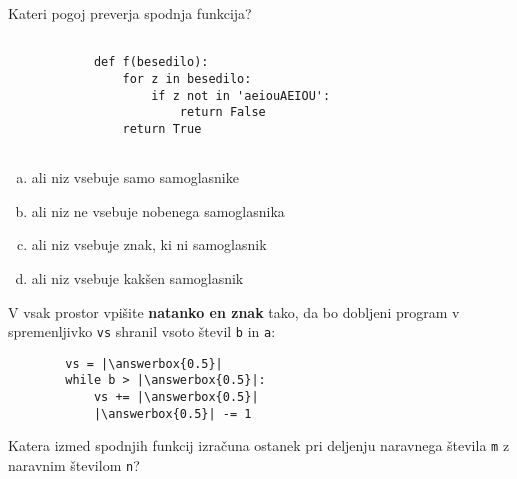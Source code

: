 \documentclass[arhiv, 10pt]{../izpit}
\newcommand{\inlinepy}[1]{\texttt{#1}}
\newcommand{\answerbox}[1]{\framebox{\vphantom{\large M}\hspace{#1cm}}}
\begin{document}
        \naloga*

        \begin{multicols}{2}
        \noindent
        Kateri pogoj preverja spodnja funkcija?
        \begin{verbatim}
        
            def f(besedilo):
                for z in besedilo:
                    if z not in 'aeiouAEIOU':
                        return False
                return True
            
        \end{verbatim}

        \begin{enumerate}[(a)]
\item ali niz vsebuje samo samoglasnike
\item ali niz ne vsebuje nobenega samoglasnika
\item ali niz vsebuje znak, ki ni samoglasnik
\item ali niz vsebuje kakšen samoglasnik
\end{enumerate}

        \end{multicols}
    
        \naloga*
        \begin{multicols}{2}
        \noindent
        V vsak prostor vpišite \textbf{natanko en znak} tako, da bo dobljeni program v spremenljivko \inlinepy{vs} shranil vsoto števil \inlinepy{b} in \inlinepy{a}:
        
        \columnbreak
        \begin{verbatim}
        vs = |\answerbox{0.5}|
        while b > |\answerbox{0.5}|:
            vs += |\answerbox{0.5}|
            |\answerbox{0.5}| -= 1
        \end{verbatim}
        \end{multicols}
    
        \clearpage
        \naloga
        
        Katera izmed spodnjih funkcij izračuna ostanek pri deljenju naravnega števila \inlinepy{m} z naravnim številom \inlinepy{n}?
    
\end{document}
